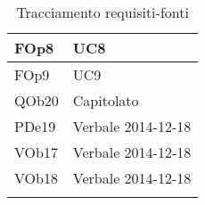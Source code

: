 \begin{longtable}{|l|p{4cm}|}
\hline
FOp8 & UC8 \linebreak \\ 
\hline
FOp9 & UC9 \linebreak \\ 
\hline
QOb20 & Capitolato \linebreak \\ 
\hline
PDe19 & Verbale 2014-12-18 \linebreak \\ 
\hline
VOb17 & Verbale 2014-12-18 \linebreak \\ 
\hline
VOb18 & Verbale 2014-12-18 \linebreak \\ 
\hline
\caption{Tracciamento requisiti-fonti}
\end{longtable}

\newpage
